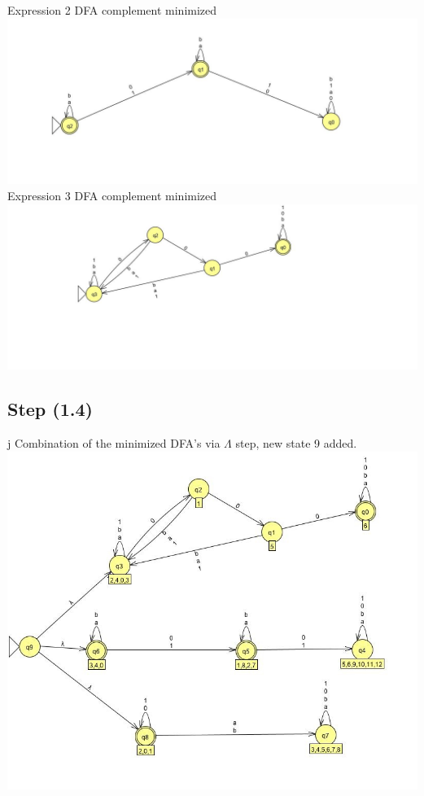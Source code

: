 \documentclass{article}
\theoremstyle{remark}
\numberwithin{equation}{section}
\begin{document}
	\noindent Expression 2 DFA complement minimized\\
	\includegraphics[width=\textwidth]{E2_mcDFA.jpg}\\
	\noindent Expression 3 DFA complement minimized\\
	\includegraphics[width=\textwidth]{E3_mcDFA.jpg}\\
	\subsection*{Step (1.4)}j
	Combination of the minimized DFA's via $\Lambda$ step, new state 9 added.\\
	\includegraphics[width=\textwidth]{E_mlambdaStep.jpg}\\
\end{document}
